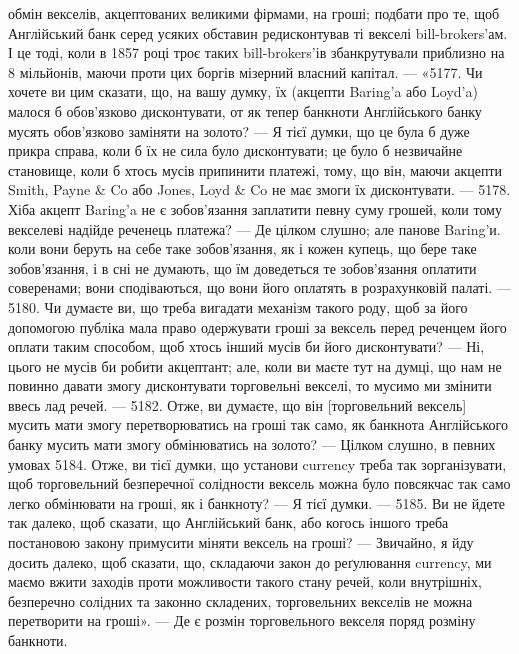 \parcont{}  %
обмін векселів, акцептованих великими фірмами, на гроші; подбати про те,
щоб Англійський банк серед усяких обставин редисконтував ті векселі bill-brokers’ам.
І це тоді, коли в 1857 році троє таких bill-brokers’ів збанкрутували
приблизно на 8 мільйонів, маючи проти цих боргів мізерний власний капітал. —
«5177. Чи хочете ви цим сказати, що, на вашу думку, їх (акцепти Baring'a або
Loyd’a) малося б обов’язково дисконтувати, от як тепер банкноти Англійського
банку мусять обов’язково заміняти на золото? — Я тієї думки, що це була б
дуже прикра справа, коли б їх не сила було дисконтувати; це було б незвичайне
становище, коли б хтось мусів припинити платежі, тому, що він, маючи акцепти
Smith, Payne \& Co або Jones, Loyd \& Co не має змоги їх дисконтувати. — 5178.
Хіба акцепт Baring’a не є зобов’язання заплатити певну суму грошей, коли тому
векселеві надійде реченець платежа? — Де цілком слушно; але панове Baring’и.
коли вони беруть на себе таке зобов’язання, як і кожен купець, що бере таке
зобов’язання, і в сні не думають, що їм доведеться те зобов’язання оплатити
соверенами; вони сподіваються, що вони його оплатять в розрахунковій палаті. —
5180. Чи думаєте ви, що треба вигадати механізм такого роду, щоб за його
допомогою публіка мала право одержувати гроші за вексель перед реченцем його
оплати таким способом, щоб хтось інший мусів би його дисконтувати? —
Ні, цього не мусів би робити акцептант; але, коли ви маєте тут на думці, що
нам не повинно давати змогу дисконтувати торговельні векселі, то мусимо ми змінити
ввесь лад речей. — 5182. Отже, ви думаєте, що він [торговельний вексель] мусить
мати змогу перетворюватись на гроші так само, як банкнота Англійського банку
мусить мати змогу обмінюватись на золото? — Цілком слушно, в певних умовах
5184. Отже, ви тієї думки, що установи currency треба так зорганізувати, щоб торговельний
безперечної солідности вексель можна було повсякчас так само легко
обмінювати на гроші, як і банкноту? — Я тієї думки. — 5185. Ви не йдете так
далеко, щоб сказати, що Англійський банк, або когось іншого треба постановою
закону примусити міняти вексель на гроші? — Звичайно, я йду досить далеко,
щоб сказати, що, складаючи закон до реґулювання currency, ми маємо вжити
заходів проти можливости такого стану речей, коли внутрішніх, безперечно
солідних та законно складених, торговельних векселів не можна перетворити
на гроші». — Де є розмін торговельного векселя поряд розміну банкноти.

